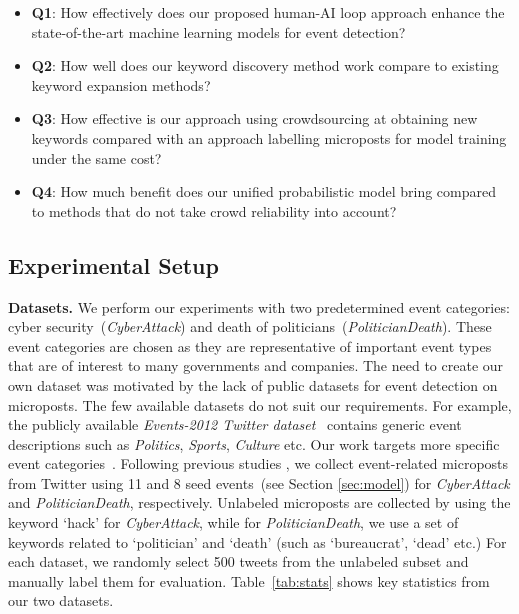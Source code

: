 \documentclass[letterpaper]{article}
\begin{document}
\begin{itemize}[noitemsep,leftmargin=*]
    \item \textbf{Q1}: How effectively does our proposed human-AI loop approach enhance the state-of-the-art machine learning models for event detection?
    \item \textbf{Q2}: How well does our keyword discovery method work compare to existing keyword expansion methods?
    \item \textbf{Q3}: How effective is our approach using crowdsourcing at obtaining new keywords compared with an approach labelling microposts for model training under the same cost?
    \item \textbf{Q4}: How much benefit does our unified probabilistic model bring compared to methods that do not take crowd reliability into account?
\end{itemize}


\subsection{Experimental Setup}

\textbf{Datasets.} We perform our experiments with two predetermined event categories: cyber security~(\emph{CyberAttack}) and death of politicians~(\emph{PoliticianDeath}). These event categories are chosen as they are representative of important event types that are of interest to many governments and companies. The need to create our own dataset was motivated by the lack of public datasets for event detection on microposts. The few available datasets do not suit our requirements. For example, the publicly available \textit{Events-2012 Twitter dataset}~\cite{mcminn2013building} contains generic event descriptions such as \textit{Politics}, \textit{Sports}, \textit{Culture} etc. Our work targets more specific event categories~\cite{bhardwaj2019TKDE}.
Following previous studies \cite{ritter2015weakly}, we collect event-related microposts from Twitter using 11 and 8 seed events~(see Section \ref{sec:model}) for \emph{CyberAttack} and \emph{PoliticianDeath}, respectively. Unlabeled microposts are collected by using the keyword \lq hack' for \emph{CyberAttack}, while for \emph{PoliticianDeath}, we use a set of keywords related to \lq politician' and \lq death' (such as \lq bureaucrat', \lq dead' etc.) %
For each dataset, we randomly select 500 tweets from the unlabeled subset and manually label them for evaluation. Table~\ref{tab:stats} shows key statistics from our two datasets.
\end{document}
